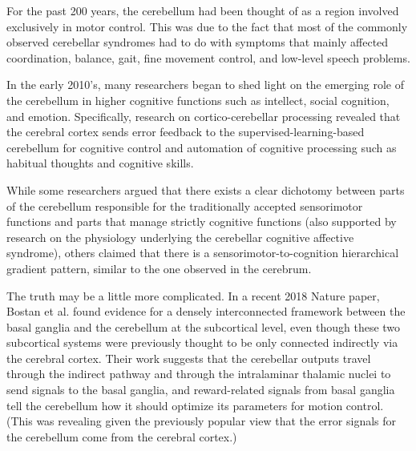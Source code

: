 
\begin{center}
  \begin{tcolorbox}[breakable,sharp corners=all,coltitle=black,colbacktitle=white,
    width=\textwidth,boxsep=5pt,left=5pt,right=5pt,
    title={\textbf{Box D: }}]


    
For the past 200 years, the cerebellum had been thought of as a region involved exclusively in motor control. This was due to the fact that most of the commonly observed cerebellar syndromes had to do with symptoms that mainly affected coordination, balance, gait, fine movement control, and low-level speech problems. 

In the early 2010's, many researchers began to shed light on the emerging role of the cerebellum in higher cognitive functions such as intellect, social cognition, and emotion. Specifically, research on cortico-cerebellar processing revealed that the cerebral cortex sends error feedback to the supervised-learning-based cerebellum for cognitive control and automation of cognitive processing such as habitual thoughts and cognitive skills. 

While some researchers argued that there exists a clear dichotomy between parts of the cerebellum responsible for the traditionally accepted sensorimotor functions and parts that manage strictly cognitive functions (also supported by research on the physiology underlying the cerebellar cognitive affective syndrome), others claimed that there is a sensorimotor-to-cognition hierarchical gradient pattern, similar to the one observed in the cerebrum. 

The truth may be a little more complicated. In a recent 2018 Nature paper, Bostan et al. found evidence for a densely interconnected framework between the basal ganglia and the cerebellum at the subcortical level, even though these two subcortical systems were previously thought to be only connected indirectly via the cerebral cortex. Their work suggests that the cerebellar outputs travel through the indirect pathway and through the intralaminar thalamic nuclei to send signals to the basal ganglia, and reward-related signals from basal ganglia tell the cerebellum how it should optimize its parameters for motion control. (This was revealing given the previously popular view that the error signals for the cerebellum come from the cerebral cortex.) 


\end{tcolorbox}
\end{center}

